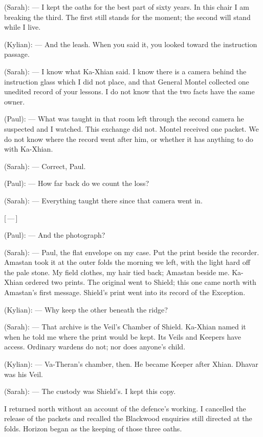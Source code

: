 \begin{room}

(Sarah): --- I kept the oaths for the best part of sixty years. In this chair I am breaking the third. The first still stands for the moment; the second will stand while I live.

(Kylian): --- And the leash. When you said it, you looked toward the instruction passage.

(Sarah): --- I know what Ka-Xhian said. I know there is a camera behind the instruction glass which I did not place, and that General Montel collected one unedited record of your lessons. I do not know that the two facts have the same owner.

(Paul): --- What was taught in that room left through the second camera he suspected and I watched. This exchange did not. Montel received one packet. We do not know where the record went after him, or whether it has anything to do with Ka-Xhian.

(Sarah): --- Correct, Paul.

(Paul): --- How far back do we count the loss?

(Sarah): --- Everything taught there since that camera went in.

\centerline{[\,---\,]}

(Paul): --- And the photograph?

(Sarah): --- Paul, the flat envelope on my case. Put the print beside the recorder. Amastan took it at the outer folds the morning we left, with the light hard off the pale stone. My field clothes, my hair tied back; Amastan beside me. Ka-Xhian ordered two prints. The original went to Shield; this one came north with Amastan's first message. Shield's print went into its record of the Exception.

(Kylian): --- Why keep the other beneath the ridge?

(Sarah): --- That archive is the Veil's Chamber of Shield. Ka-Xhian named it when he told me where the print would be kept. Its Veils and Keepers have access. Ordinary wardens do not; nor does anyone's child.

(Kylian): --- Va-Theran's chamber, then. He became Keeper after Xhian. Dhavar was his Veil.

(Sarah): --- The custody was Shield's. I kept this copy.

\end{room}

I returned north without an account of the defence's working. I cancelled the release of the packets and recalled the Blackwood enquiries still directed at the folds. Horizon began as the keeping of those three oaths.\par

